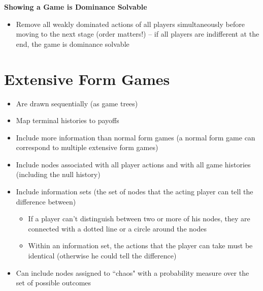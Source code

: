 \documentclass{report}
\newcommand{\FlowerSmall}{\mbox{\raisebox{-1pt}{\small\EightFlowerPetalRemoved}}} %
\begin{document}
\begin{mdframed}
	\medskip
	\begin{center} \textbf{{\large Showing a Game is Dominance Solvable}} \end{center}
	\begin{itemize}[label=\FlowerSmall]
		\item{Remove all weakly dominated actions of all players simultaneously before moving to the next stage (order matters!) -- if all players are indifferent at the end, the game is dominance solvable}
	\end{itemize} \smallskip
\end{mdframed} \bigskip

\section*{Extensive Form Games}
\begin{itemize}
	\item{Are drawn sequentially (as game trees)}
	\item Map terminal histories to payoffs
	\item{Include more information than normal form games (a normal form game can correspond to multiple extensive form games)}
	\item{Include nodes associated with all player actions and with all game histories (including the null history)}
	\item{Include information sets (the set of nodes that the acting player can tell the difference between)}
		\begin{itemize}
			\item{If a player can't distinguish between two or more of his nodes, they are connected with a dotted line or a circle around the nodes}
			\item{Within an information set, the actions that the player can take must be identical (otherwise he could tell the difference)}
		\end{itemize}
	\item{Can include nodes assigned to ``chaos" with a probability measure over the set of possible outcomes}
\end{itemize}\bigskip
\end{document}
